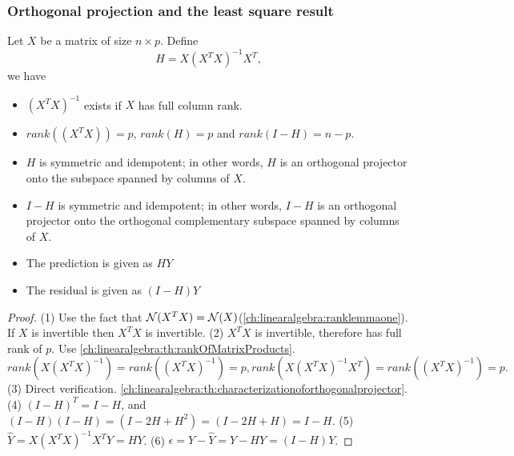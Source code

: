 \begin{refsection}
\subsubsection{Orthogonal projection and the least square result}
\begin{lemma}\label{ch:theory-of-statistics:th:propertylinearregression}
	Let $X$ be a matrix of size $n\times p$. 
	Define $$H = X(X^TX)^{-1}X^T,$$ we have
	\begin{itemize}
		\item $(X^TX)^{-1}$ exists if $X$ has full column rank.
		\item $rank((X^TX)) = p$, $rank(H) = p$ and $rank(I-H) = n-p$.
		\item $H$ is symmetric and idempotent; in other words, $H$ is an orthogonal projector onto the subspace spanned by columns of $X$.
		\item $I-H$ is symmetric and idempotent; in other words, $I-H$ is an orthogonal projector onto the orthogonal complementary subspace spanned by columns of $X$.
		\item The prediction is given as $HY$
		\item The residual is given as $(I-H)Y$
	\end{itemize}
\end{lemma}
\begin{proof}
	(1) Use the fact that $\mathcal{N}(X^TX) = \mathcal{N}(X)$(\autoref{ch:linearalgebra:ranklemmaone}). If $X$ is invertible then $X^TX$ is invertible.
	(2) $X^TX$ is invertible, therefore has full rank of $p$.  Use \autoref{ch:linearalgebra:th:rankOfMatrixProducts}. $$rank(X(X^TX)^{-1}) = rank((X^TX)^{-1}) = p, rank(X(X^TX)^{-1}X^T) = rank((X^TX)^{-1}) = p.$$
	(3) Direct verification. \autoref{ch:linearalgebra:th:characterizationoforthogonalprojector}.
	(4) $(I-H)^T = I - H$, and $(I-H)(I-H) = (I - 2H + H^2) = (I - 2H + H) = I - H$.
	(5) $\hat{Y} = X(X^TX)^{-1}X^TY = HY$.
	(6) $\epsilon = Y - \hat{Y} = Y - HY = (I-H)Y$.
\end{proof}



\end{refsection}
